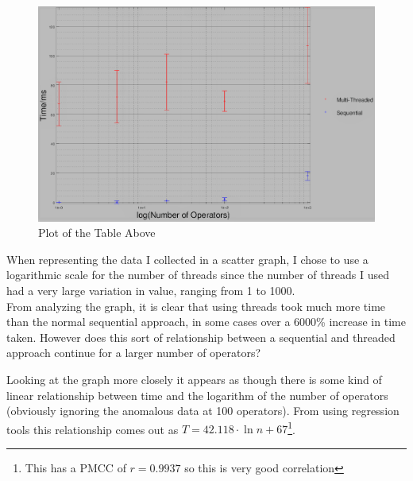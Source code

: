 \documentclass[../../../../../main.tex]{subfiles}
\begin{document}
\begin{figure}[H]
	\begin{center}
		\includegraphics[width=\textwidth]{graphs/plot}
		\caption{Plot of the Table Above}
	\end{center}
\end{figure}
\newpage
\noindent
When representing the data I collected in a scatter graph, I chose to use a logarithmic scale for the number of threads since the number of threads I used had a very large variation in value, ranging from 1 to 1000.\\
From analyzing the graph, it is clear that using threads took much more time than the normal sequential approach, in some cases over a 6000\% increase in time taken. However does this sort of relationship between a sequential and threaded approach continue for a larger number of operators?

Looking at the graph more closely it appears as though there is some kind of linear relationship between time and the logarithm of the number of operators (obviously ignoring the anomalous data at 100 operators). From using regression tools this relationship comes out as $T = 42.118\cdot \ln{n} + 67$\footnote{This has a PMCC of $r=0.9937$ so this is very good correlation}.
\end{document}
